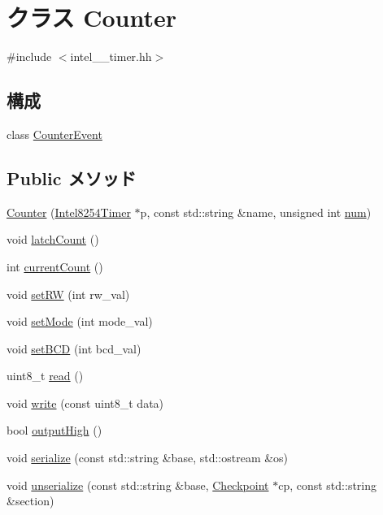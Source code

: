 \hypertarget{classIntel8254Timer_1_1Counter}{
\section{クラス Counter}
\label{classIntel8254Timer_1_1Counter}
}


{\ttfamily \#include $<$intel\_\_\-timer.hh$>$}\subsection*{構成}
\begin{DoxyCompactItemize}
\item 
class \hyperlink{classIntel8254Timer_1_1Counter_1_1CounterEvent}{CounterEvent}
\end{DoxyCompactItemize}
\subsection*{Public メソッド}
\begin{DoxyCompactItemize}
\item 
\hyperlink{classIntel8254Timer_1_1Counter_a5fe920d0924fff4ed3a2de514f66c579}{Counter} (\hyperlink{classIntel8254Timer}{Intel8254Timer} $\ast$p, const std::string \&name, unsigned int \hyperlink{classIntel8254Timer_1_1Counter_a41ddefd3473727cad32a9767c10faed8}{num})
\item 
void \hyperlink{classIntel8254Timer_1_1Counter_a8002cc449afaedfc055ee4160b60fb0c}{latchCount} ()
\item 
int \hyperlink{classIntel8254Timer_1_1Counter_a6e7edf97a0e9c17b694fcf76c62fab7a}{currentCount} ()
\item 
void \hyperlink{classIntel8254Timer_1_1Counter_a003bc7e494482e1a689be6151977b568}{setRW} (int rw\_\-val)
\item 
void \hyperlink{classIntel8254Timer_1_1Counter_ae3afb307b529d4a7f35da891e289f45d}{setMode} (int mode\_\-val)
\item 
void \hyperlink{classIntel8254Timer_1_1Counter_a2797b27bd7f8ace4f14e8f3106547be9}{setBCD} (int bcd\_\-val)
\item 
uint8\_\-t \hyperlink{classIntel8254Timer_1_1Counter_a74dc94b86d35235e39a000a34b3085c5}{read} ()
\item 
void \hyperlink{classIntel8254Timer_1_1Counter_a2bd23b2d4f41e6c765125180c3e324bd}{write} (const uint8\_\-t data)
\item 
bool \hyperlink{classIntel8254Timer_1_1Counter_a9003eb9ea7431f3438de9e52a11d579b}{outputHigh} ()
\item 
void \hyperlink{classIntel8254Timer_1_1Counter_ab4138b21b48e3371a8e20df72b675a88}{serialize} (const std::string \&base, std::ostream \&os)
\item 
void \hyperlink{classIntel8254Timer_1_1Counter_a147c320e3d6506edf5587a40cd8e430d}{unserialize} (const std::string \&base, \hyperlink{classCheckpoint}{Checkpoint} $\ast$cp, const std::string \&section)
\end{DoxyCompactItemize}
